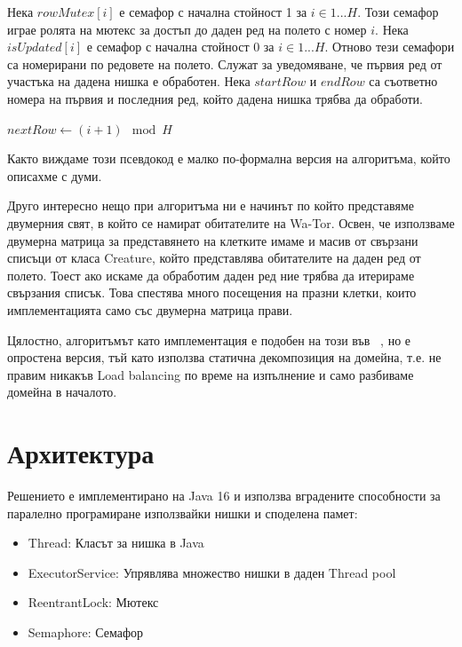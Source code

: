 \documentclass{article}
\begin{document}
Нека $rowMutex[i]$ е семафор с начална стойност 1 за $i \in 1...H$.
Този семафор играе ролята на мютекс за достъп до даден ред на полето с номер $i$.
Нека $isUpdated[i]$ е семафор с начална стойност 0 за $i \in 1...H$.
Отново тези семафори са номерирани по редовете на полето. Служат за уведомяване,
че първия ред от участъка на дадена нишка е обработен.
Нека $startRow$ и $endRow$ са съответно номера на първия и последния ред,
който дадена нишка трябва да обработи.
\bigbreak
\begin{algorithmic}
	\State $nextRow\gets (i + 1) \mod H$
		\State {}
		\State {}
		\State {}
	\EndIf

	\State {}

		\State {}
		\State {}
		\State {}
	\EndIf
\EndFor
\end{algorithmic}
\bigbreak
Както виждаме този псевдокод е малко по-формална версия на алгоритъма, който описахме с думи.

Друго интересно нещо при алгоритъма ни е начинът по който представяме двумерния свят, в който се намират
обитателите на Wa-Tor. Освен, че използваме двумерна матрица за представянето на клетките
имаме и масив от свързани списъци от класа Creature, който представлява обитателите на даден
ред от полето. Тоест ако искаме да обработим даден ред ние трябва да итерираме свързания списък.
Това спестява много посещения на празни клетки, които имплементацията само със двумерна матрица прави.

Цялостно, алгоритъмът като имплементация е подобен на този във ~\cite{bounded_neighbours}, но е опростена
версия, тъй като използва статична декомпозиция на домейна, т.е. не правим никакъв Load balancing
по време на изпълнение и само разбиваме домейна в началото.

\newpage

\section{Архитектура}
Решението е имплементирано на Java 16 и използва вградените способности за паралелно програмиране
използвайки нишки и споделена памет:
\begin{itemize}
	\item Thread: Класът за нишка в Java
	\item ExecutorService: Упрявлява множество нишки в даден Thread pool
	\item ReentrantLock: Мютекс
	\item Semaphore: Семафор
\end{itemize}
\end{document}
